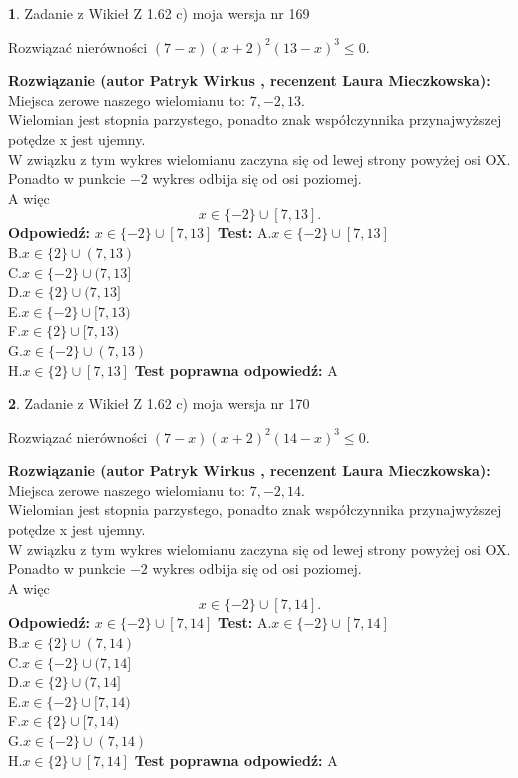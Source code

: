 \documentclass[12pt, a4paper]{article}
\theoremstyle{definition} %
\newtheorem{zad}{}
\newcommand{\zadStart}[1]{\begin{zad}#1\newline}
\newcommand{\zadStop}{\end{zad}}
\newcommand{\rozwStart}[2]{\noindent \textbf{Rozwiązanie (autor #1 , recenzent #2): }\newline}
\newcommand{\rozwStop}{\newline}
\newcommand{\odpStart}{\noindent \textbf{Odpowiedź:}\newline}
\newcommand{\odpStop}{\newline}
\newcommand{\testStart}{\noindent \textbf{Test:}\newline}
\newcommand{\testStop}{\newline}
\newcommand{\kluczStart}{\noindent \textbf{Test poprawna odpowiedź:}\newline}
\newcommand{\kluczStop}{\newline}
\begin{document}
\zadStart{Zadanie z Wikieł Z 1.62 c) moja wersja nr 169}

Rozwiązać nierówności $(7-x)(x+2)^{2}(13-x)^{3}\le0$.
\zadStop
\rozwStart{Patryk Wirkus}{Laura Mieczkowska}
Miejsca zerowe naszego wielomianu to: $7, -2, 13$.\\
Wielomian jest stopnia parzystego, ponadto znak współczynnika przy\linebreak najwyższej potędze x jest ujemny.\\ W związku z tym wykres wielomianu zaczyna się od lewej strony powyżej osi OX.\\
Ponadto w punkcie $-2$ wykres odbija się od osi poziomej.\\
A więc $$x \in \{-2\} \cup [7,13].$$
\rozwStop
\odpStart
$x \in \{-2\} \cup [7,13]$
\odpStop
\testStart
A.$x \in \{-2\} \cup [7,13]$\\
B.$x \in \{2\} \cup (7,13)$\\
C.$x \in \{-2\} \cup (7,13]$\\
D.$x \in \{2\} \cup (7,13]$\\
E.$x \in \{-2\} \cup [7,13)$\\
F.$x \in \{2\} \cup [7,13)$\\
G.$x \in \{-2\} \cup (7,13)$\\
H.$x \in \{2\} \cup [7,13]$
\testStop
\kluczStart
A
\kluczStop



\zadStart{Zadanie z Wikieł Z 1.62 c) moja wersja nr 170}

Rozwiązać nierówności $(7-x)(x+2)^{2}(14-x)^{3}\le0$.
\zadStop
\rozwStart{Patryk Wirkus}{Laura Mieczkowska}
Miejsca zerowe naszego wielomianu to: $7, -2, 14$.\\
Wielomian jest stopnia parzystego, ponadto znak współczynnika przy\linebreak najwyższej potędze x jest ujemny.\\ W związku z tym wykres wielomianu zaczyna się od lewej strony powyżej osi OX.\\
Ponadto w punkcie $-2$ wykres odbija się od osi poziomej.\\
A więc $$x \in \{-2\} \cup [7,14].$$
\rozwStop
\odpStart
$x \in \{-2\} \cup [7,14]$
\odpStop
\testStart
A.$x \in \{-2\} \cup [7,14]$\\
B.$x \in \{2\} \cup (7,14)$\\
C.$x \in \{-2\} \cup (7,14]$\\
D.$x \in \{2\} \cup (7,14]$\\
E.$x \in \{-2\} \cup [7,14)$\\
F.$x \in \{2\} \cup [7,14)$\\
G.$x \in \{-2\} \cup (7,14)$\\
H.$x \in \{2\} \cup [7,14]$
\testStop
\kluczStart
A
\kluczStop
\end{document}
